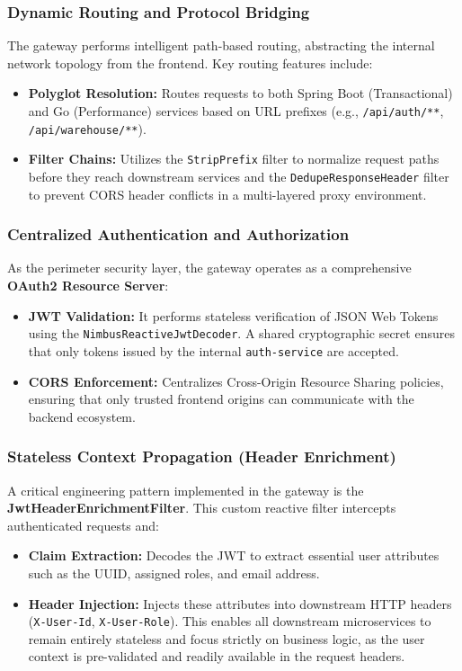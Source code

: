 \documentclass[12pt,a4paper]{report}
\begin{document}
\subsubsection{Dynamic Routing and Protocol Bridging}
The gateway performs intelligent path-based routing, abstracting the internal network topology from the frontend. Key routing features include:
\begin{itemize}
    \item \textbf{Polyglot Resolution:} Routes requests to both Spring Boot (Transactional) and Go (Performance) services based on URL prefixes (e.g., \texttt{/api/auth/**}, \texttt{/api/warehouse/**}).
    \item \textbf{Filter Chains:} Utilizes the \texttt{StripPrefix} filter to normalize request paths before they reach downstream services and the \texttt{DedupeResponseHeader} filter to prevent CORS header conflicts in a multi-layered proxy environment.
\end{itemize}

\subsubsection{Centralized Authentication and Authorization}
As the perimeter security layer, the gateway operates as a comprehensive \textbf{OAuth2 Resource Server}:
\begin{itemize}
    \item \textbf{JWT Validation:} It performs stateless verification of JSON Web Tokens using the \texttt{NimbusReactiveJwtDecoder}. A shared cryptographic secret ensures that only tokens issued by the internal \texttt{auth-service} are accepted.
    \item \textbf{CORS Enforcement:} Centralizes Cross-Origin Resource Sharing policies, ensuring that only trusted frontend origins can communicate with the backend ecosystem.
\end{itemize}

\subsubsection{Stateless Context Propagation (Header Enrichment)}
A critical engineering pattern implemented in the gateway is the \textbf{JwtHeaderEnrichmentFilter}. This custom reactive filter intercepts authenticated requests and:
\begin{itemize}
    \item \textbf{Claim Extraction:} Decodes the JWT to extract essential user attributes such as the UUID, assigned roles, and email address.
    \item \textbf{Header Injection:} Injects these attributes into downstream HTTP headers (\texttt{X-User-Id}, \texttt{X-User-Role}). This enables all downstream microservices to remain entirely stateless and focus strictly on business logic, as the user context is pre-validated and readily available in the request headers.
\end{itemize}
\end{document}
